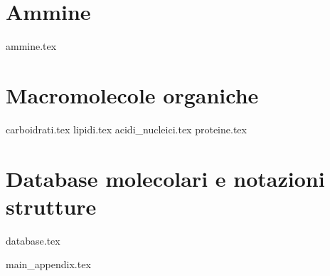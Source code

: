 \documentclass[a4paper,12pt,oneside]{book} %
\begin{document}

\part{Ammine} %
{ammine.tex}

\part{Macromolecole organiche}
{carboidrati.tex} %
{lipidi.tex} %
{acidi_nucleici.tex} %
{proteine.tex} %

\part{Database molecolari e notazioni strutture}
{database.tex} %

\backmatter
{main_appendix.tex}


\printbibliography



\end{document}
